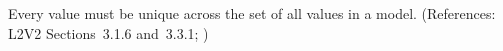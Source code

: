 Every   value must be unique across the set of all
 values in a model.  (References: L2V2 Sections~3.1.6 and~3.3.1;
)
